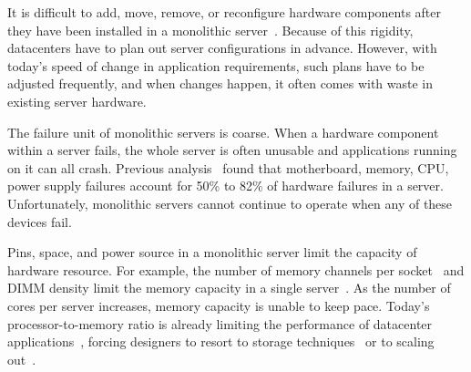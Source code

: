 \documentclass[10pt,times,twocolumn]{z2-article}
\begin{document}
It is difficult to add, move, remove, or reconfigure hardware components
after they have been installed in a monolithic server~\cite{FB-Wedge100}. %
Because of this rigidity, datacenters have to plan out server configurations in advance.
However, with today's speed of change in application requirements, such plans have to be adjusted frequently,
and when changes happen, it often comes with waste in existing server hardware.


The failure unit of monolithic servers is coarse.
When a hardware component within a server fails, %
the whole server is often unusable and applications running on it can all crash.
Previous analysis~\cite{Failure-Disk-FAST07} found that motherboard, memory, CPU, power supply failures account for 
50\% to 82\% of hardware failures in a server.
Unfortunately, monolithic servers cannot continue to operate when any of these devices fail.

Pins, space, and power source in a monolithic server limit the capacity of hardware resource.
For example, the number of memory channels per socket~\cite{ITRS14} and DIMM density 
limit the memory capacity in a single server~\cite{HP-MemoryEvol,MemoryWall95,MemoryCube-ISCA17,Lim09-disaggregate}. 
As the number of cores per server increases, memory capacity is unable to keep pace.
Today's processor-to-memory ratio is already limiting the performance of datacenter applications~\cite{Ongaro11-RamCloud,page-graph}, 
forcing designers to resort to storage techniques~\cite{Zhang-FAST15-FlashGraph} 
or to scaling out~\cite{GU17-NSDI,Dragojevic14-FaRM,Dragojevic15-FaRM,Gonzalez12-OSDI}.
\fi
\end{document}
